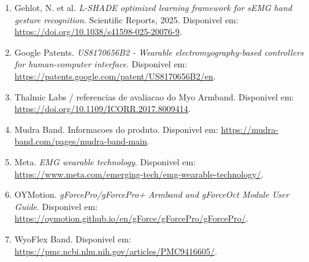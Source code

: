 \documentclass[12pt,oneside,a4paper,english,brazilian]{abntex2}
\begin{document}
\begin{enumerate}
  \item Gehlot, N. et al. \textit{L-SHADE optimized learning framework for sEMG hand gesture recognition}. Scientific Reports, 2025. Disponivel em: \url{https://doi.org/10.1038/s41598-025-20076-9}.
  \item Google Patents. \textit{US8170656B2 - Wearable electromyography-based controllers for human-computer interface}. Disponivel em: \url{https://patents.google.com/patent/US8170656B2/en}.
  \item Thalmic Labs / referencias de avaliacao do Myo Armband. Disponivel em: \url{https://doi.org/10.1109/ICORR.2017.8009414}.
  \item Mudra Band. Informacoes do produto. Disponivel em: \url{https://mudra-band.com/pages/mudra-band-main}.
  \item Meta. \textit{EMG wearable technology}. Disponivel em: \url{https://www.meta.com/emerging-tech/emg-wearable-technology/}.
  \item OYMotion. \textit{gForcePro/gForcePro+ Armband and gForceOct Module User Guide}. Disponivel em: \url{https://oymotion.github.io/en/gForce/gForcePro/gForcePro/}.
  \item WyoFlex Band. Disponivel em: \url{https://pmc.ncbi.nlm.nih.gov/articles/PMC9416605/}.
\end{enumerate}
\end{document}
